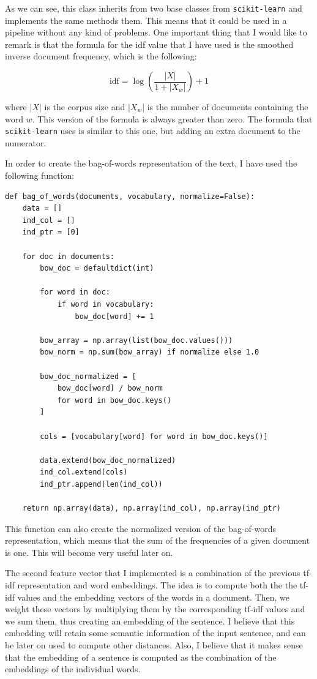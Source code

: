 \documentclass[11pt,a4paper]{article}
\begin{document}
As we can see, this class inherits from two base classes from \texttt{scikit-learn}
and implements the same methods them. This means that it could be used in a pipeline
without any kind of problems. One important thing that I would like to remark is that
the formula for the idf value that I have used is the smoothed inverse document frequency,
which is the following:

\begin{equation}
  \text{idf} = \log\left( \frac{|X|}{1 + |X_w|} \right) + 1
\end{equation}

\noindent where $|X|$ is the corpus size and $|X_w|$ is the number of documents containing
the word $w$. This version of the formula is always greater than zero. The formula
that \texttt{scikit-learn} uses is similar to this one, but adding an extra document
to the numerator.

In order to create the bag-of-words representation of the text, I have used the
following function:

\begin{lstlisting}
def bag_of_words(documents, vocabulary, normalize=False):
    data = []
    ind_col = []
    ind_ptr = [0]

    for doc in documents:
        bow_doc = defaultdict(int)

        for word in doc:
            if word in vocabulary:
                bow_doc[word] += 1

        bow_array = np.array(list(bow_doc.values()))
        bow_norm = np.sum(bow_array) if normalize else 1.0

        bow_doc_normalized = [
            bow_doc[word] / bow_norm
            for word in bow_doc.keys()
        ]

        cols = [vocabulary[word] for word in bow_doc.keys()]

        data.extend(bow_doc_normalized)
        ind_col.extend(cols)
        ind_ptr.append(len(ind_col))

    return np.array(data), np.array(ind_col), np.array(ind_ptr)
\end{lstlisting}

This function can also create the normalized version of the bag-of-words representation,
which means that the sum of the frequencies of a given document is one. This will become
very useful later on.

The second feature vector that I implemented is a combination of the previous tf-idf
representation and word embeddings. The idea is to compute both the the tf-idf values and
the embedding vectors of the words in a document. Then, we weight these vectors by multiplying
them by the corresponding tf-idf values and we sum them, thus creating an embedding
of the sentence. I believe that this embedding will retain some semantic information
of the input sentence, and can be later on used to compute other distances. Also,
I believe that it makes sense that the embedding of a sentence is computed as the
combination of the embeddings of the individual words.
\end{document}
